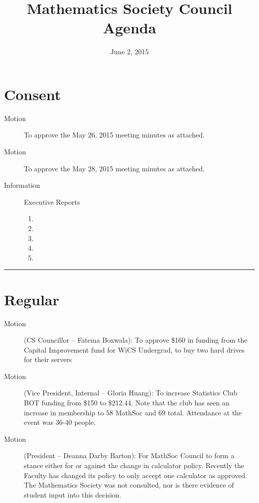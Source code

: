 \documentclass[12pt,letterpaper]{article}
\title{Mathematics Society Council Agenda}
\date{June 2, 2015}
\newcommand{\HRule}{\rule{\linewidth}{0.4mm}}
\begin{document}
\hypersetup{}




\section*{Consent}
\begin{description}
	\item[Motion] To approve the May 26, 2015 meeting minutes as attached.
	\item[Motion] To approve the May 28, 2015 meeting minutes as attached.
	\item[Information] Executive Reports
	\begin{enumerate}
		\item {}
		\item {}
		\item {}
		\item {}
		\item {}
	\end{enumerate}
\end{description}
\HRule
\section*{Regular}
\begin{description}
	\item[Motion] (CS Councillor – Fatema Boxwala): To approve \$160 in funding from the Capital Improvement fund for WiCS Undergrad, to buy two hard drives for their servers
	\item[Motion] (Vice President, Internal – Gloria Huang): To increase Statistics Club BOT funding from \$150 to \$212.44. Note that the club has seen an increase in membership to 58 MathSoc and 69 total. Attendance at the event was 36-40 people.
	\item[Motion] (President – Deanna Darby Barton): For MathSoc Council to form a stance either for or against the change in calculator policy. 
Recently the Faculty has changed its policy to only accept one calculator as approved. The Mathematics Society was not consulted, nor is there evidence of student input into this decision.
\end{description}

\newpage




\newpage


\end{document}
